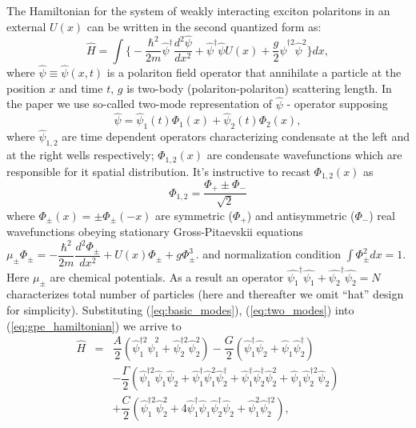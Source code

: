 \documentclass[aps, pre, preprint, groupedaddress, superscriptaddress, showkeys, showpacs] {revtex4-1}
\begin{document}
%
The Hamiltonian for the system of weakly interacting exciton polaritons in an external $U(x)$ can be written in the second quantized form as:
%
\begin{equation}
\hat{H} = \int \Big\{ -\dfrac{\hbar^2}{2m} \hat{\psi}^\dag \dfrac{d^2 \hat{\psi}}{dx^2} + \hat{\psi}^\dag \hat{\psi} U(x) + \dfrac{g}{2} \hat{\psi}^{\dag 2} \hat{\psi}^2  \Big\} dx,
\label{eq:gpe_hamiltonian}
\end{equation}
%
where $\hat{\psi} \equiv \hat{\psi}(x, t)$ is a polariton field operator that annihilate a particle at the position $x$ and time $t$, $g$ is two-body (polariton-polariton) scattering length.
In the paper we use so-called two-mode representation of $\hat{\psi}$ - operator supposing
%
\begin{equation}
\hat{\psi} = \hat{\psi}_1(t) \Phi_1(x) + \hat{\psi}_2(t) \Phi_2(x),
\label{eq:two_modes}
\end{equation}
%
where $\hat{\psi}_{1,2}$ are time dependent operators characterizing condensate at the left and at the right wells respectively; $\Phi_{1,2}(x)$ are condensate wavefunctions which are responsible for it spatial distribution.
It's instructive to recast $\Phi_{1,2}(x)$ as
%
\begin{equation}
\Phi_{1,2} = \dfrac{\Phi_+ \pm \Phi_-}{\sqrt{2}}
\label{eq:basic_modes}
\end{equation}
%
where $\Phi_{\pm}(x) = \pm \Phi_{\pm}(-x)$ are symmetric ($\Phi_+$) and antisymmetric ($\Phi_-$) real wavefunctions obeying stationary Gross-Pitaevskii equations $\mu_{\pm} \Phi_{\pm} = -\dfrac{\hbar^2}{2m} \dfrac{d^2 \Phi_{\pm}}{dx^2} + U(x) \Phi_{\pm} + g \Phi_{\pm}^3$.
%
%
and normalization condition $\int \Phi_{\pm}^2 dx = 1$.
Here $\mu_{\pm}$ are chemical potentials.
As a result an operator $\hat{\psi_1}^\dag\hat{\psi_1} + \hat{\psi_2}^\dag\hat{\psi_2} = N$ characterizes total number of particles (here and thereafter we omit ``hat'' design for simplicity).
Substituting (\ref{eq:basic_modes}), (\ref{eq:two_modes}) into (\ref{eq:gpe_hamiltonian}) we arrive to
% 
\begin{equation}
\begin{array}{lcl}
\hat{H} & = & \dfrac{A}{2} (\hat{\psi}_1^{\dag 2} \hat{\psi}_1^2 + \hat{\psi}_2^{\dag 2} \hat{\psi}_2^2) - \dfrac{G}{2} (\hat{\psi}_1^\dag \hat{\psi}_2 + \hat{\psi}_1 \hat{\psi}_2^\dag) \\ [8pt]
& & -\dfrac{\Gamma}{2} (\hat{\psi}_1^{\dag 2} \hat{\psi}_1 \hat{\psi}_2 + \hat{\psi}_1^\dag \hat{\psi}_1^2 \hat{\psi}_2^\dag + \hat{\psi}_1^\dag \hat{\psi}_2^\dag \hat{\psi}_2^2 + \hat{\psi}_1 \hat{\psi}_2^{\dag 2} \hat{\psi}_2) \\ [8pt]
& & +\dfrac{C}{2} (\hat{\psi}_1^{\dag 2} \hat{\psi}_2^2 + 4 \hat{\psi}_1^\dag \hat{\psi}_1 \hat{\psi}_2^\dag \hat{\psi}_2 + \hat{\psi}_1^2 \hat{\psi}_2^{\dag 2}),
\end{array}
\label{eq:hamiltonian}
\end{equation}
\end{document}
